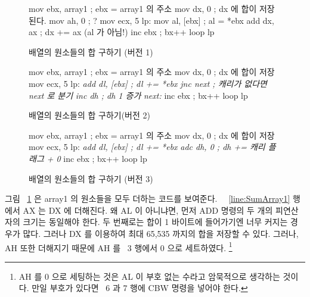 \begin{figure}[t]
\begin{AsmCodeListing}[frame=single,commandchars=\\\{\}]
      mov    ebx, array1           ; ebx =  array1 의 주소
      mov    dx, 0                 ; dx 에 합이 저장된다. 
      mov    ah, 0                 ; ?
      mov    ecx, 5
lp:
      mov    al, [ebx]             ; al = *ebx
      add    dx, ax                ; dx += ax (al 가 아님!) \label{line:SumArray1}
      inc    ebx                   ; bx++
      loop   lp
\end{AsmCodeListing}
\caption{배열의 원소들의 합 구하기 (버전 1)\label{fig:SumArray1}}
\end{figure}

\begin{figure}[t]
\begin{AsmCodeListing}[frame=single,commandchars=\\\{\}]
      mov    ebx, array1           ; ebx = array1 의 주소
      mov    dx, 0                 ; dx 에 합이 저장
      mov    ecx, 5
lp:
\textit{      add    dl, [ebx]             ; dl += *ebx}
\textit{      jnc    next                  ; 캐리가 없다면 next 로 분기}
\textit{      inc    dh                    ; dh 1 증가}
\textit{next:}
      inc    ebx                   ; bx++
      loop   lp
\end{AsmCodeListing}
\caption{배열의 원소들의 합 구하기(버전 2)\label{fig:SumArray2}}
\end{figure}

\begin{figure}[t]
\begin{AsmCodeListing}[frame=single,commandchars=\\\{\}]
      mov    ebx, array1           ; ebx = array1 의 주소
      mov    dx, 0                 ; dx 에 합이 저장
      mov    ecx, 5
lp:
\textit{      add    dl, [ebx]             ; dl += *ebx}
\textit{      adc    dh, 0                 ; dh += 캐리 플래그 + 0}
      inc    ebx                   ; bx++
      loop   lp
\end{AsmCodeListing}
\caption{배열의 원소들의 합 구하기 (버전 3)\label{fig:SumArray3}}
\end{figure}

그림 ~\ref{fig:SumArray1} 은 {\code array1} 의 원소들을 모두 더하는
코드를 보여준다. ~~\ref{line:SumArray1} 행에서 AX 는 DX 에 더해진다. 
왜 AL 이 아니냐면, 먼저 {\code ADD} 명령의 두 개의 피연산자의 크기는
동일해야 한다. 두 번째로는 합이 1 바이트에 들어가기엔 너무 커지는 경우가 많다. 
그러나 DX 를 이용하여 최대 65,535 까지의 합을 저장할 수 있다. 그러나, AH 
또한 더해지기 때문에 AH 를 ~3 행에서 0 으로 세트하였다.
\footnote{AH 를 0 으로 세팅하는 것은 AL 이 부호 없는 수라고 암묵적으로
생각하는 것이다. 만일 부호가 있다면 ~6 과 7 행에 {\code CBW}
명령을 넣어야 한다.}


